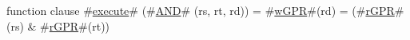 function clause #\hyperref[zexecute]{execute}# (#\hyperref[zAND]{AND}# (rs, rt, rd)) =
  {
    #\hyperref[zwGPR]{wGPR}#(rd) = (#\hyperref[zrGPR]{rGPR}#(rs) & #\hyperref[zrGPR]{rGPR}#(rt))
  }
